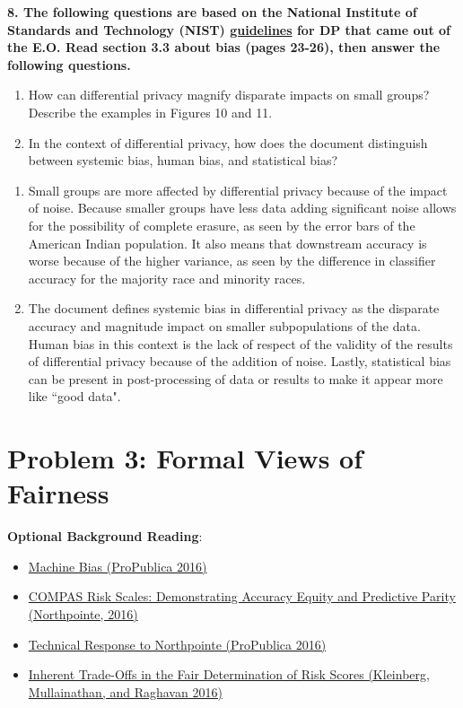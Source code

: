 \documentclass{article}
\begin{document}
\textbf{8. The following questions are based on the National Institute of Standards and Technology (NIST)
\href{https://nvlpubs.nist.gov/nistpubs/SpecialPublications/NIST.SP.800-226.ipd.pdf}{guidelines} for DP that came out of the E.O. Read section 3.3 about bias (pages 23-26), then answer the following questions.}


\begin{enumerate}[label=\Alph*.]
\item How can differential privacy magnify disparate impacts on small groups? Describe the examples in Figures 10 and 11.
\item In the context of differential privacy, how does the document distinguish between systemic bias, human bias, and statistical bias?
\end{enumerate}

\bigskip
\begin{mdframed}
\begin{enumerate}[label=\Alph*.]
    \item Small groups are more affected by differential privacy because of the impact of noise. Because smaller groups have less data adding significant noise allows for the possibility of complete erasure, as seen by the error bars of the American Indian population. It also means that downstream accuracy is worse because of the higher variance, as seen by the difference in classifier accuracy for the majority race and minority races.
    \item The document defines systemic bias in differential privacy as the disparate accuracy and magnitude impact on smaller subpopulations of the data. Human bias in this context is the lack of respect of the validity of the results of differential privacy because of the addition of noise. Lastly, statistical bias can be present in post-processing of data or results to make it appear more like ``good data".
\end{enumerate}
\end{mdframed}
\bigskip



\clearpage
\section*{Problem 3: Formal Views of Fairness}

\textbf{Optional Background Reading}:
\begin{itemize}
    \item \href{https://www.propublica.org/article/machine-bias-risk-assessments-in-criminal-sentencing}{Machine Bias (ProPublica 2016)}
    \item \href{https://www.documentcloud.org/documents/2998391-ProPublica-Commentary-Final-070616.html}{COMPAS Risk Scales: Demonstrating Accuracy Equity and Predictive Parity (Northpointe, 2016)}
    \item \href{https://www.propublica.org/article/technical-response-to-northpointe}{Technical Response to Northpointe (ProPublica 2016)}
    \item \href{https://arxiv.org/pdf/1609.05807}{Inherent Trade-Offs in the Fair Determination of Risk Scores (Kleinberg, Mullainathan, and Raghavan 2016)}
\end{itemize}
\end{document}
